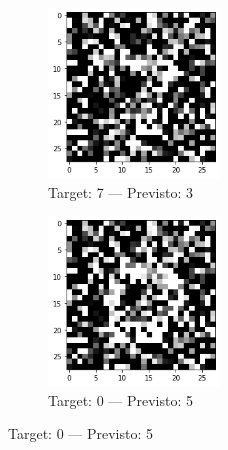 \documentclass[12pt, a4paper]{article}
\begin{document}
\begin{figure}[H]
    \begin{subfigure}{0.5\textwidth}
        \centering
        \caption{Target: 7 --- Previsto: 3}
        \includegraphics[width=0.5\textwidth]{ErrClass1.png}
    \end{subfigure}
    \begin{subfigure}{0.5\textwidth}
        \centering
        \caption{Target: 0 --- Previsto: 5}
        \includegraphics[width=0.5\textwidth]{ErrClass2.png}
    \end{subfigure}
\end{figure}
\end{document}
